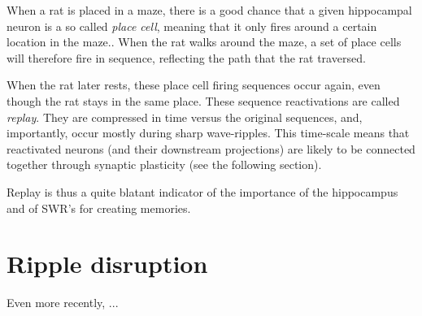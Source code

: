When a rat is placed in a maze, there is a good chance that a given hippocampal neuron is a so called \emph{place cell}, meaning that it only fires around a certain location in the maze.\footnotemark{}. When the rat walks around the maze, a set of place cells will therefore fire in sequence, reflecting the path that the rat traversed.


When the rat later rests, these place cell firing sequences occur again, even though the rat stays in the same place. These sequence reactivations are called \emph{replay}. They are compressed in time versus the original sequences, and, importantly, occur mostly during sharp wave-ripples. This time-scale means that reactivated neurons (and their downstream projections) are likely to be connected together through synaptic plasticity (see the following section).

Replay is thus a quite blatant indicator of the importance of the hippocampus and of SWR's for creating memories.








\section{Ripple disruption}

Even more recently, ...

